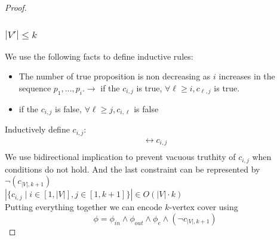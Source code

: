 \documentclass{article}
\begin{document}
\begin{proof}
\subsubsection*{$|V'| \leq k$}
We use the following facts to define inductive rules:
\begin{itemize}
    \item The number of true proposition is non decreasing as $i$ increases in the sequence $p_1, \dots, p_i. \rightarrow$ if the $c_{i, j}$ is true, 
    $\forall \ell \geq i, c_{\ell, j}$ is true.
    \item if the $c_{i, j}$ is false, $\forall \ell \geq j, c_{i, \ell}$ is false
\end{itemize}
Inductively define $c_{i, j}$:
\begin{align*}
    [c_{i-1, j} \lor (c_{i-1,j-1} \land p_{i, in}) ]  \leftrightarrow c_{i, j}\\
\end{align*}
We use bidirectional implication to prevent vacuous truthity of $c_{i, j}$ when conditions do not hold. And the last constraint can be represented by $\neg(c_{|V|, k+1})$\\
$|\{c_{i, j} \mid i \in [1, |V|], j \in [1, k+1]\}| \in O(|V|\cdot k)$\\
Putting everything together we can encode $k$-vertex cover using 
\[\phi = \phi_{in} \land \phi_{out} \land \phi_{e} \land (\neg c_{|V|, k+1})\]
\end{proof}
\end{document}

